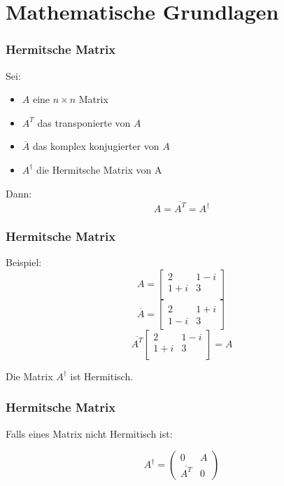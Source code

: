\section{Mathematische Grundlagen}

\begin{frame}
    \frametitle{Hermitsche Matrix}
    Sei: 
    \begin{itemize}
        \item   $A$ eine $n \times n$ Matrix
        \item   $A^T$ das transponierte von $A$
        \item   $\overline A$  das komplex konjugierter von $A$
        \item   $A^\dagger$ die Hermitsche Matrix von A
   \end{itemize}
   \hfil
    Dann:
    $$A = \overline {A^T} = A^\dagger $$
    
\end{frame}
\begin{frame}
    \frametitle{Hermitsche Matrix}
    
    Beispiel:
    $$A=\begin{bmatrix}2 & 1-i \\ 1+i & 3 \\ \end{bmatrix}$$
    $$\overline A = \begin{bmatrix} 2 & 1+i \\ 1-i & 3 \end{bmatrix}$$
    $$\overline {A^T} \begin{bmatrix} 2 & 1-i \\ 1+i & 3 \\ \end{bmatrix}= A$$
    \hfil
    
    Die Matrix $A^\dagger$ ist Hermitisch.
\end{frame}
\begin{frame}
    \frametitle{Hermitsche Matrix}
    
    Falls eines Matrix nicht Hermitisch ist:

    \hfil

    $$A^\dagger = \begin{pmatrix} 0 & A \\ \overline {A^T} & 0 \end{pmatrix}$$
\end{frame}


